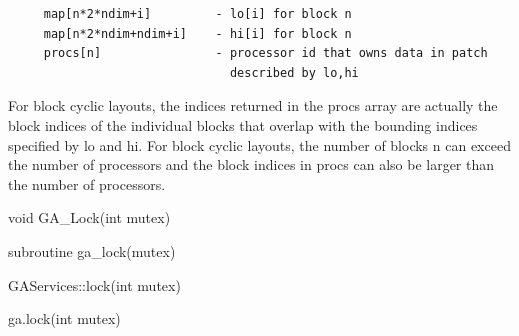 \documentclass[12pt]{article}
\begin{document}
\begin{cxxdesc}
\begin{verbatim}
     map[n*2*ndim+i]         - lo[i] for block n
     map[n*2*ndim+ndim+i]    - hi[i] for block n
     procs[n]                - processor id that owns data in patch
                               described by lo,hi
\end{verbatim}
\end{cxxdesc}

For block cyclic layouts, the indices returned in the procs array are
actually the block indices of the individual blocks that overlap with
the bounding indices specified by lo and hi. For block cyclic layouts,
the number of blocks n can exceed the number of processors and the
block indices in procs can also be larger than the number of processors.




\begin{capi}
\begin{ccode}
void GA_Lock(int mutex)
\end{ccode}
\begin{funcargs}
\end{funcargs}
\end{capi}

\begin{fapi}
\begin{fcode}
subroutine ga_lock(mutex)
\end{fcode}
\begin{funcargs}
\end{funcargs}
\end{fapi}

\begin{cxxapi}
\begin{cxxcode}
GAServices::lock(int mutex)
\end{cxxcode}
\begin{funcargs}
\end{funcargs}
\end{cxxapi}

\begin{pyapi}
\begin{pycode}
ga.lock(int mutex)
\end{pycode}
\end{pyapi}

\ncoll
\end{document}
